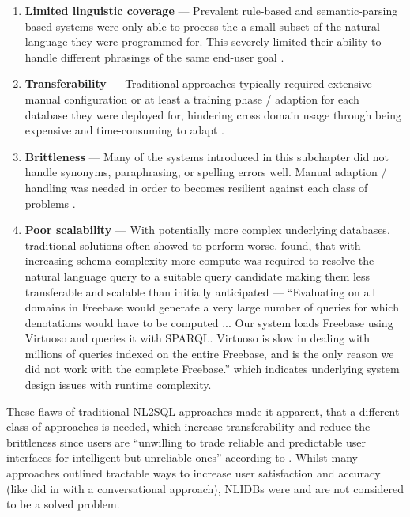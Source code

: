 \begin{enumerate}
    \item \textbf{Limited linguistic coverage} — Prevalent rule-based and semantic-parsing based systems were only able to 
          process the a small subset of the natural language they were programmed for. This severely limited their 
          ability to handle different phrasings of the same end-user goal \citep{StringKernels, UnnaturalQueryLanguage, 
          Lunar, Ladder}.
    \item \textbf{Transferability} — Traditional approaches typically required extensive manual configuration or at least
          a training phase / adaption for each database they were deployed for, hindering cross domain usage through being 
          expensive and time-consuming to adapt \citep{NLIDBs, Lunar}.
    \item \textbf{Brittleness} — Many of the systems introduced in this subchapter did not handle synonyms, paraphrasing,   
          or spelling errors well. Manual adaption / handling was needed in order to becomes resilient against each class
          of problems \citep{StringKernels, SQLizer}.
    \item \textbf{Poor scalability} — With potentially more complex underlying databases, traditional 
          solutions often showed to perform worse. \citeauthor*{GraphMatching} found, that with increasing schema
          complexity more compute was required to resolve the natural language query to a suitable query candidate
          making them less transferable and scalable than initially anticipated \citep{GraphMatching} — ``Evaluating on
          all domains in Freebase would generate a very large number of queries for which denotations would have to be 
          computed ... Our system loads Freebase using Virtuoso and queries it with SPARQL. Virtuoso is slow in dealing with
          millions of queries indexed on the entire Freebase, and is the only reason we did not work with the complete
          Freebase.'' which indicates underlying system design issues with runtime complexity.
\end{enumerate}

These flaws of traditional NL2SQL approaches made it apparent, that a different class of approaches is needed, which 
increase transferability and reduce the brittleness since users are ``unwilling to trade reliable and predictable user 
interfaces for intelligent but unreliable ones'' according to \cite{NLIDBTheory}. Whilst many approaches outlined tractable 
ways to increase user satisfaction and accuracy (like \citeauthor*{Rendezvous} did in \citeyear{Rendezvous} with a 
conversational approach), NLIDBs were and are not considered to be a solved problem.

